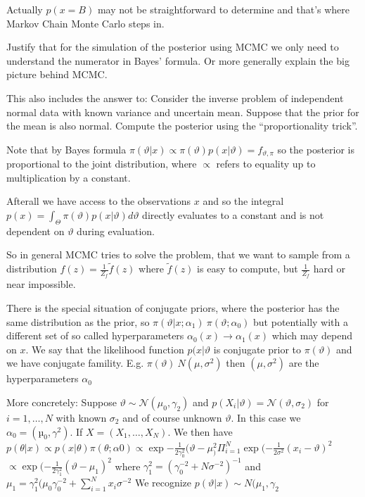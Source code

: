 Actually \( p(x = B) \) may not be straightforward to determine
and that's where Markov Chain Monte Carlo steps in.


Justify that for the simulation of the posterior using MCMC we only need to
understand the numerator in Bayes’ formula. Or more generally explain the big
picture behind MCMC.

This also includes the answer to:
Consider the inverse problem of independent normal data with known variance and
uncertain mean. Suppose that the prior for the mean is also normal. Compute the
posterior using the “proportionality trick”.


Note that by Bayes formula \( \pi(\vartheta|x) \propto \pi(\vartheta)p(x|\vartheta) = f_{\vartheta, \pi} \)
so the posterior is proportional to the joint distribution, where
\( \propto \) refers to equality up to multiplication by a constant. 

Afterall 
we have access to the observations \( x \) and so the integral \( p(x) = \int_{\Theta} \pi(\vartheta)p(x|\vartheta) d\vartheta \)
directly evaluates to a constant and is not dependent on \( \vartheta \) during evaluation.

So in general MCMC tries to solve the problem, that we want to sample from a distribution \( f(z) = \frac{1}{Z_f}\tilde{f}(z) \)
where \( \tilde{f}(z) \) is easy to compute, but \( \frac{1}{Z_f} \) hard or near impossible.

There is the special situation of conjugate priors, where the posterior 
has the same distribution as the prior, so \( \pi(\vartheta|x;\alpha_1) ~ \pi(\vartheta;\alpha_0) \)
but potentially with a different set of so called hyperparameters \( \alpha_0(x) \to \alpha_1(x) \) which may depend on \( x \).
We say that the likelihood function \( p(x|\vartheta \) is conjugate prior to \( \pi(\vartheta) \) and we have conjugate famility.
E.g. \( \pi(\vartheta) ~ N(\mu,\sigma^2) \) then \( (\mu,\sigma^{2}) \) are the hyperparameters \( \alpha_0 \)

More concretely:
Suppose \( \vartheta \sim \mathcal{N}(\mu_0, \gamma_2) \) and \( p(X_i | \vartheta) = \mathcal{N}(\vartheta, \sigma_2) \)
for \( i = 1, \dots, N \) with known \( \sigma_2 \) and of course unknown \( \vartheta \). In this case we
\( α_0 = (µ_0, γ^2) \). If \( X = (X_1, \dots, X_N ) \).
We then have
\( p(θ | x) \propto p(x | θ)\pi(θ; α0) \propto \exp{-\frac{1}{2\gamma_0^2}(\vartheta - \mu_)^2}\Pi_{i=1}^{N} \exp(-\frac{1}{2\sigma^2}(x_i - \vartheta)^2 \)
\( \propto \exp(-\frac{1}{2\gamma_1^{2}}(\vartheta - \mu_1)^2 \)
where \( \gamma_1^2 = (\gamma_0^{-2} + N\sigma^{-2})^{-1} \) and \( \mu_1 = \gamma_1^{2}(\mu_0 \gamma_0^{-2} + \sum_{i=1}^N x_i \sigma^{-2} \)
We recognize \( p(\vartheta|x) \sim N(\mu_1, \gamma_2\)

